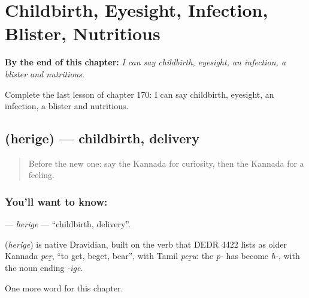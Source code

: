
\chapter{Childbirth, Eyesight, Infection, Blister, Nutritious}
\label{ch:ka-childbirth-eyesight-infection-blister-nutritious}

\begin{chapteropening}
\textbf{By the end of this chapter:} \emph{I can say childbirth, eyesight, an infection, a blister and nutritious.}

Complete the last lesson of chapter 170: I can say childbirth, eyesight, an infection, a blister and nutritious.
\end{chapteropening}

\section[\texorpdfstring{\kn{ಹೆರಿಗೆ} (herige)}{ಹೆರಿಗೆ (herige)}]{ (herige) — childbirth, delivery}

\label{lesson:KA-C170-herige}



\begin{quote}
Before the new one: say the Kannada for curiosity, then the Kannada for a feeling.
\end{quote}

\subsection*{You'll want to know: }
\textbf{} — \emph{herige} — \textquotedblleft{}childbirth, delivery\textquotedblright{}.

\begin{cousinweb}
\textbf{} (\emph{herige}) is native Dravidian, built on the verb that DEDR 4422 lists as older Kannada \emph{peṟ}, \textquotedblleft{}to get, beget, bear\textquotedblright{}, with Tamil \emph{peṟu}: the \emph{p-} has become \emph{h-}, with the noun ending \emph{-ige}.
\end{cousinweb}

\begin{grammarlens}[title={What you've built}]
One more word for this chapter.
\end{grammarlens}

